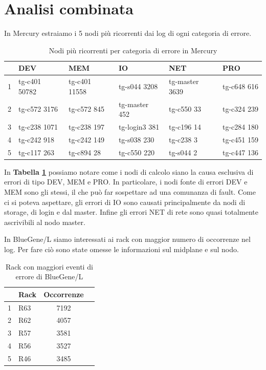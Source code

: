 	\section{Analisi combinata}
		In Mercury estraiamo i 5 nodi più ricorrenti dai log di ogni categoria di errore.
		\begin{table}
			\footnotesize
			\caption{Nodi più ricorrenti per categoria di errore in Mercury}
			\label{tab:ffda-Minn}
			\centering
			\begin{tabular}{clllll}
				\toprule
				\textbf{} &
				\textbf{DEV} &
				\textbf{MEM} &
				\textbf{IO} &
				\textbf{NET} &
				\textbf{PRO}\\
				\midrule
				1 &
				tg-c401 50782 &
				tg-c401 11558 &
				tg-s044 3208 &
				tg-master 3639 &
				tg-c648 616\\
				\midrule
				2 &
				tg-c572 3176 &
				tg-c572 845 &
				tg-master 452 &
				tg-c550 33 &
				tg-c324 239\\
				\midrule
				3 &
				tg-c238 1071 &
				tg-c238 197 &
				tg-login3 381 &
				tg-c196 14 &
				tg-c284 180\\
				\midrule
				4 &
				tg-c242 918 &
				tg-c242 149 &
				tg-s038 230 &
				tg-c238 3 &
				tg-c451 159\\
				\midrule
				5 &
				tg-c117 263 &
				tg-c894 28 &
				tg-c550 220 &
				tg-s044 2 &
				tg-c447 136\\
				\bottomrule			
			\end{tabular}
		\end{table}
		In \textbf{Tabella \ref{tab:ffda-Minn}} possiamo notare come i nodi di calcolo siano la causa esclusiva di errori di tipo DEV, MEM e PRO. In particolare, i nodi fonte di errori DEV e MEM sono gli stessi, il che può far sospettare ad una comunanza di fault. Come ci si poteva aspettare, gli errori di IO sono causati principalmente da nodi di storage, di login e dal master. Infine gli errori NET di rete sono quasi totalmente ascrivibili al nodo master.\par
		In BlueGene/L siamo interessati ai rack con maggior numero di occorrenze nel log. Per fare ciò sono state omesse le informazioni sul midplane e sul nodo.
		\begin{table}
			\footnotesize
			\caption{Rack con maggiori eventi di errore di BlueGene/L}
			\label{tab:ffda-BGr}
			\centering
			\begin{tabular}{clcc}
				\toprule
				\textbf{} &
				\textbf{Rack} &
				\textbf{Occorrenze}\\
				\midrule
				1 &
				R63 &
				7192\\
				\midrule
				2 &
				R62 &
				4057\\
				\midrule
				3 &
				R57 &
				3581\\
				\midrule
				4 &
				R56 &
				3527\\
				\midrule
				5 &
				R46 &
				3485\\
				\bottomrule			
			\end{tabular}
		\end{table}
